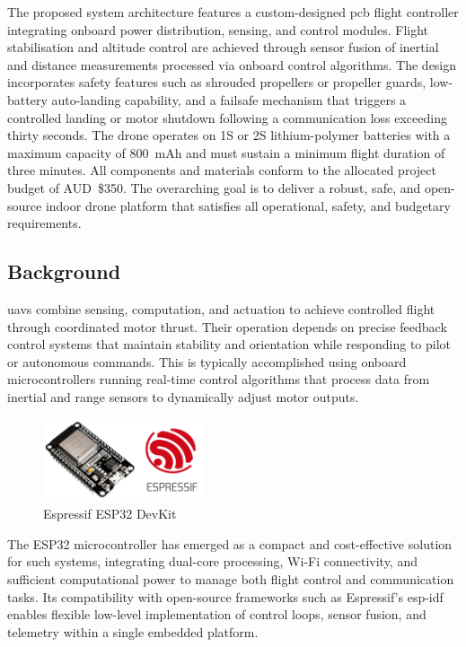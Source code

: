The proposed system architecture features a custom-designed \gls{pcb} flight controller integrating onboard power distribution, sensing, and control modules. Flight stabilisation and altitude control are achieved through sensor fusion of inertial and distance measurements processed via onboard control algorithms. The design incorporates safety features such as shrouded propellers or propeller guards, low-battery auto-landing capability, and a failsafe mechanism that triggers a controlled landing or motor shutdown following a communication loss exceeding thirty seconds. The drone operates on 1S or 2S lithium-polymer batteries with a maximum capacity of 800~mAh and must sustain a minimum flight duration of three minutes. All components and materials conform to the allocated project budget of AUD~\$350. The overarching goal is to deliver a robust, safe, and open-source indoor drone platform that satisfies all operational, safety, and budgetary requirements. 

\subsection{Background}

\glspl{uav} combine sensing, computation, and actuation to achieve controlled flight through coordinated motor thrust. Their operation depends on precise feedback control systems that maintain stability and orientation while responding to pilot or autonomous commands. This is typically accomplished using onboard microcontrollers running real-time control algorithms that process data from inertial and range sensors to dynamically adjust motor outputs.

\begin{figure}[H]
    \centering
    \captionsetup{justification=centering, margin=1cm}
    \includegraphics[width=0.42\textwidth]{img/intro-espressif.PNG}
    \caption{Espressif ESP32 DevKit~\cite{iotdesignpro2019}}
\end{figure}

\pagebreak

The ESP32 microcontroller has emerged as a compact and cost-effective solution for such systems, integrating dual-core processing, Wi-Fi connectivity, and sufficient computational power to manage both flight control and communication tasks. Its compatibility with open-source frameworks such as Espressif’s \gls{esp-idf} enables flexible low-level implementation of control loops, sensor fusion, and telemetry within a single embedded platform.

